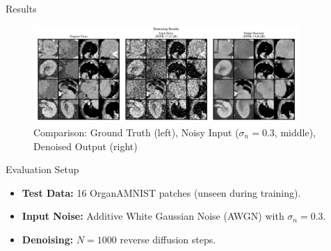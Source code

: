 \documentclass[10pt]{beamer}
\begin{document}
\begin{frame}{Results}

  \begin{figure}
    \centering

    \includegraphics[width=0.9\textwidth]{final_comparison.png}

    \caption{\footnotesize Comparison: Ground Truth (left), Noisy Input ($\sigma_n=0.3$, middle), Denoised Output (right)}
  \end{figure}

  \vspace{-0.2cm}

  \begin{block}{Evaluation Setup}
    \footnotesize
    \begin{itemize} \itemsep 0pt
        \item \textbf{Test Data:} 16 OrganAMNIST patches (unseen during training).
        \item \textbf{Input Noise:} Additive White Gaussian Noise (AWGN) with $\sigma_n = 0.3$.
        \item \textbf{Denoising:} $N=1000$ reverse diffusion steps.
    \end{itemize}
  \end{block}

\end{frame}
\end{document}
